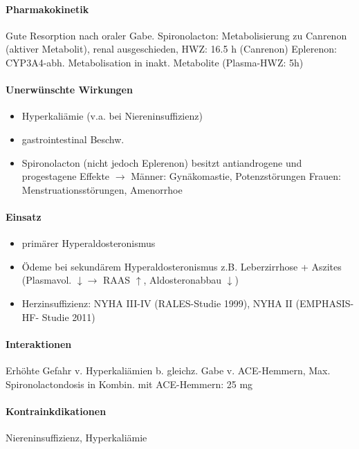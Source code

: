 \documentclass[10pt,a4paper]{report}
\begin{document}
\paragraph{Pharmakokinetik}
Gute Resorption nach oraler Gabe. Spironolacton: Metabolisierung zu Canrenon (aktiver Metabolit), renal ausgeschieden, HWZ: 16.5 h (Canrenon)
Eplerenon: CYP3A4-abh. Metabolisation in inakt. Metabolite (Plasma-HWZ: 5h)
\paragraph{Unerwünschte Wirkungen}
\begin{itemize}
	\item Hyperkaliämie (v.a. bei Niereninsuffizienz) 
	\item gastrointestinal Beschw.
	\item Spironolacton (nicht jedoch Eplerenon) besitzt antiandrogene und progestagene Effekte  $\rightarrow$ 	Männer: Gynäkomastie, Potenzstörungen Frauen: Menstruationsstörungen, Amenorrhoe
\end{itemize}
\paragraph{Einsatz}
\begin{itemize}
	\item primärer Hyperaldosteronismus 
	\item Ödeme bei sekundärem Hyperaldosteronismus z.B. Leberzirrhose + Aszites (Plasmavol. $\downarrow \rightarrow$ RAAS $\uparrow$, Aldosteronabbau $\downarrow$) 
	\item Herzinsuffizienz: NYHA III-IV (RALES-Studie 1999), NYHA II (EMPHASIS-HF-	Studie 2011)
\end{itemize}
\paragraph{Interaktionen} Erhöhte Gefahr v. Hyperkaliämien b. gleichz. Gabe v. ACE-Hemmern, Max. Spironolactondosis in Kombin. mit ACE-Hemmern: 25 mg
\paragraph{Kontrainkdikationen}Niereninsuffizienz, Hyperkaliämie
\end{document}
